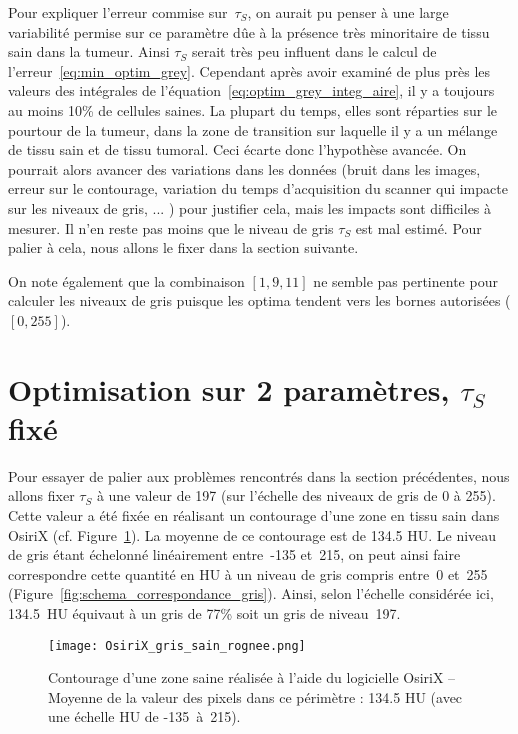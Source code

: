 \documentclass[main.tex]{subfiles}
\begin{document}
Pour expliquer l'erreur commise sur~$\tau_S$, on aurait pu penser à une large variabilité permise sur ce paramètre dûe à la présence très minoritaire de tissu sain dans la tumeur. Ainsi $\tau_S$ serait très peu influent dans le calcul de l'erreur~\eqref{eq:min_optim_grey}. Cependant après avoir examiné de plus près les valeurs des intégrales de l'équation~\eqref{eq:optim_grey_integ_aire}, il y a toujours au moins 10\% de cellules saines. La plupart du temps, elles sont réparties sur le pourtour de la tumeur, dans la zone de transition sur laquelle il y a un mélange de tissu sain et de tissu tumoral. Ceci écarte donc l'hypothèse avancée. On pourrait alors avancer des variations dans les données (bruit dans les images, erreur sur le contourage, variation du temps d'acquisition du scanner qui impacte sur les niveaux de gris, ... ) pour justifier cela, mais les impacts sont difficiles à mesurer. 
Il n'en reste pas moins que le niveau de gris $\tau_S$ est mal estimé. 
Pour palier à cela, nous allons le fixer dans la section suivante.

On note également que la combinaison $[1,9,11]$ ne semble pas pertinente pour calculer les niveaux de gris puisque les optima tendent vers les bornes autorisées ($[0,255]$).

\section{Optimisation sur 2 paramètres, $\tau_S$ fixé}
Pour essayer de palier aux problèmes rencontrés dans la section précédentes, nous allons fixer $\tau_S$ à une valeur de 197 (sur l'échelle des niveaux de gris de 0 à 255). Cette valeur a été fixée en réalisant un contourage d'une zone en tissu sain dans OsiriX (cf. Figure~\ref{fig:contourage_sain}). La moyenne de ce contourage est de 134.5 HU. Le niveau de gris étant échelonné linéairement entre~-135 et~215, on peut ainsi faire correspondre cette quantité en HU à un niveau de gris compris entre~0 et~255 (\cf Figure~\ref{fig:schema_correspondance_gris}). Ainsi, selon l'échelle considérée ici, 134.5~HU équivaut à un gris de 77\% soit un gris de niveau~197.




\begin{figure}
\texttt{[image: OsiriX\_gris\_sain\_rognee.png]}
\caption{\label{fig:contourage_sain}Contourage d'une zone saine réalisée à l'aide du logicielle OsiriX -- Moyenne de la valeur des pixels dans ce périmètre : 134.5 HU (avec une échelle HU de \mbox{-135 à 215}).}
\end{figure}
\end{document}
